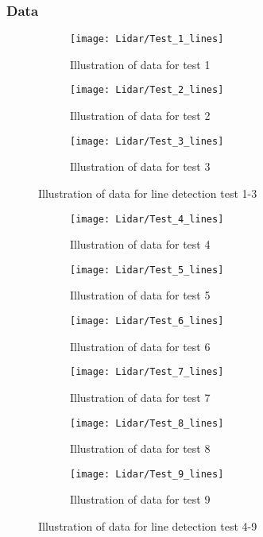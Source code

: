 \documentclass[../Head/Main.tex]{subfiles}
\begin{document}
\subsubsection*{Data}
\begin{figure}[H]
  \begin{subfigure}[b]{0.3\textwidth}
  	\centering
    \texttt{[image: Lidar/Test\_1\_lines]}
    \caption{Illustration of data for test 1}
    \label{fig:Linestest1}
  \end{subfigure}
  \hfill
  \begin{subfigure}[b]{0.3\textwidth}
  	\centering
    \texttt{[image: Lidar/Test\_2\_lines]}
    \caption{Illustration of data for test 2}
    \label{fig:Linestest2}
  \end{subfigure}
  \hfill
  \begin{subfigure}[b]{0.3\textwidth}
    \centering
    \texttt{[image: Lidar/Test\_3\_lines]}
    \caption{Illustration of data for test 3}
    \label{fig:Linestest3}
  \end{subfigure}
  \caption{Illustration of data for line detection test 1-3}
  \label{fig:Linestests13}
\end{figure}
\begin{figure}[H]
  \begin{subfigure}[b]{0.3\textwidth}
    \centering
    \texttt{[image: Lidar/Test\_4\_lines]}
    \caption{Illustration of data for test 4}
    \label{fig:Linestest4}
  \end{subfigure}
  \hfill
  \begin{subfigure}[b]{0.3\textwidth}
    \centering
    \texttt{[image: Lidar/Test\_5\_lines]}
    \caption{Illustration of data for test 5}
    \label{fig:Linestest5}
  \end{subfigure}
  \hfill
  \begin{subfigure}[b]{0.3\textwidth}
    \centering
    \texttt{[image: Lidar/Test\_6\_lines]}
    \caption{Illustration of data for test 6}
    \label{fig:Linestest6}
  \end{subfigure}
  \hfill
  \begin{subfigure}[b]{0.3\textwidth}
    \centering
    \texttt{[image: Lidar/Test\_7\_lines]}
    \caption{Illustration of data for test 7}
    \label{fig:Linestest7}
  \end{subfigure}
  \hfill
  \begin{subfigure}[b]{0.3\textwidth}
    \centering
    \texttt{[image: Lidar/Test\_8\_lines]}
    \caption{Illustration of data for test 8}
    \label{fig:Linestest8}
  \end{subfigure}
  \hfill
  \begin{subfigure}[b]{0.3\textwidth}
    \centering
    \texttt{[image: Lidar/Test\_9\_lines]}
    \caption{Illustration of data for test 9}
    \label{fig:Linestest9}
  \end{subfigure}
  \caption{Illustration of data for line detection test 4-9}
  \label{fig:Linestests49}
\end{figure}
\end{document}
